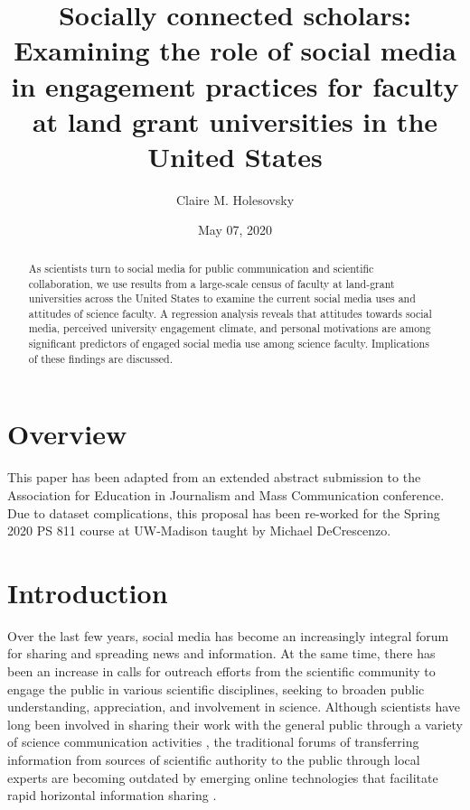 \documentclass[12pt,]{article}
\title{Socially connected scholars: Examining the role of social media in engagement practices for faculty at land grant universities in the United States}
\author{Claire M. Holesovsky}
\date{May 07, 2020}
\begin{document}
\maketitle
\begin{abstract}
As scientists turn to social media for public communication and scientific collaboration, we use results from a large-scale census of faculty at land-grant universities across the United States to examine the current social media uses and attitudes of science faculty. A regression analysis reveals that attitudes towards social media, perceived university engagement climate, and personal motivations are among significant predictors of engaged social media use among science faculty. Implications of these findings are discussed.
\end{abstract}

{
\hypersetup{linkcolor=}
\setcounter{tocdepth}{2}
\tableofcontents
}
\hypertarget{overview}{%
\section{Overview}\label{overview}}

This paper has been adapted from an extended abstract submission to the Association for Education in Journalism and Mass Communication conference. Due to dataset complications, this proposal has been re-worked for the Spring 2020 PS 811 course at UW-Madison taught by Michael DeCrescenzo.

\hypertarget{introduction}{%
\section{Introduction}\label{introduction}}

Over the last few years, social media has become an increasingly integral forum for sharing and spreading news and information. At the same time, there has been an increase in calls for outreach efforts from the scientific community to engage the public in various scientific disciplines, seeking to broaden public understanding, appreciation, and involvement in science. Although scientists have long been involved in sharing their work with the general public through a variety of science communication activities \autocite{rowe2005typology}, the traditional forums of transferring information from sources of scientific authority to the public through local experts are becoming outdated by emerging online technologies that facilitate rapid horizontal information sharing \autocite{keller2014mind}.
\end{document}
